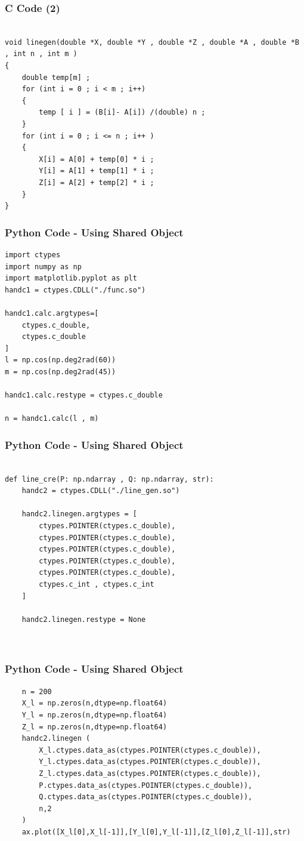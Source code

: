 \documentclass{beamer}
\begin{document}
\begin{frame}[fragile]
    \frametitle{C Code (2)}
    \begin{lstlisting}
    
void linegen(double *X, double *Y , double *Z , double *A , double *B , int n , int m )
{
    double temp[m] ; 
    for (int i = 0 ; i < m ; i++)
    {
        temp [ i ] = (B[i]- A[i]) /(double) n ; 
    }
    for (int i = 0 ; i <= n ; i++ )
    {
        X[i] = A[0] + temp[0] * i ; 
        Y[i] = A[1] + temp[1] * i ;
        Z[i] = A[2] + temp[2] * i ; 
    }
}

\end{lstlisting}
\end{frame}

\begin{frame}[fragile]
    \frametitle{Python Code - Using Shared Object}
    \begin{lstlisting}
import ctypes
import numpy as np
import matplotlib.pyplot as plt
handc1 = ctypes.CDLL("./func.so")

handc1.calc.argtypes=[
    ctypes.c_double,
    ctypes.c_double
]
l = np.cos(np.deg2rad(60))
m = np.cos(np.deg2rad(45))

handc1.calc.restype = ctypes.c_double

n = handc1.calc(l , m)
\end{lstlisting}
\end{frame}


\begin{frame}[fragile]
    \frametitle{Python Code - Using Shared Object}
    \begin{lstlisting}

def line_cre(P: np.ndarray , Q: np.ndarray, str):
    handc2 = ctypes.CDLL("./line_gen.so")

    handc2.linegen.argtypes = [
        ctypes.POINTER(ctypes.c_double),
        ctypes.POINTER(ctypes.c_double),
        ctypes.POINTER(ctypes.c_double),
        ctypes.POINTER(ctypes.c_double),
        ctypes.POINTER(ctypes.c_double),
        ctypes.c_int , ctypes.c_int
    ]

    handc2.linegen.restype = None
    


\end{lstlisting}
\end{frame}
\begin{frame}[fragile]
    \frametitle{Python Code - Using Shared Object}
    \begin{lstlisting}
    n = 200
    X_l = np.zeros(n,dtype=np.float64)
    Y_l = np.zeros(n,dtype=np.float64)
    Z_l = np.zeros(n,dtype=np.float64)
    handc2.linegen (
        X_l.ctypes.data_as(ctypes.POINTER(ctypes.c_double)),
        Y_l.ctypes.data_as(ctypes.POINTER(ctypes.c_double)),
        Z_l.ctypes.data_as(ctypes.POINTER(ctypes.c_double)),
        P.ctypes.data_as(ctypes.POINTER(ctypes.c_double)),
        Q.ctypes.data_as(ctypes.POINTER(ctypes.c_double)),
        n,2
    )
    ax.plot([X_l[0],X_l[-1]],[Y_l[0],Y_l[-1]],[Z_l[0],Z_l[-1]],str)

    \end{lstlisting}
\end{frame}
\end{document}

